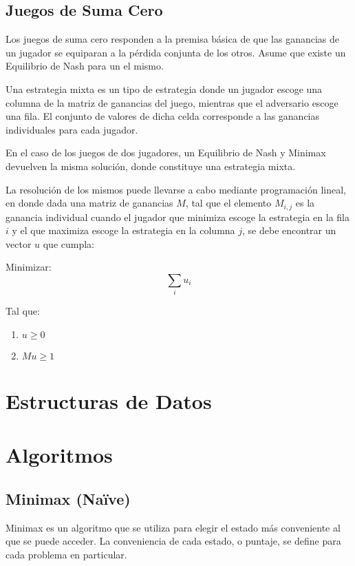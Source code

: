 \documentclass[10pt,a4paper,notitlepage,draft]{article}
\newenvironment{definition}[1][Definición]{\begin{trivlist}
\item[\hskip \labelsep {\bfseries #1}]}{\end{trivlist}}
\begin{document}
\subsection{Juegos de Suma Cero}

Los juegos de suma cero responden a la premisa básica de que las ganancias de un jugador se equiparan a la pérdida conjunta de los otros. Asume que existe un Equilibrio de Nash para un el mismo.

\begin{definition}
Una estrategia mixta es un tipo de estrategia donde un jugador escoge una columna de la matriz de ganancias del juego, mientras que el adversario escoge una fila. El conjunto de valores de dicha celda corresponde a las ganancias individuales para cada jugador.
\end{definition}

En el caso de los juegos de dos jugadores, un Equilibrio de Nash y Minimax devuelven la misma solución, donde constituye una estrategia mixta.

La resolución de los mismos puede llevarse a cabo mediante programación lineal, en donde dada una matriz de ganancias $M$, tal que el elemento $M_{i, j}$ es la ganancia individual cuando el jugador que minimiza escoge la estrategia en la fila $i$ y el que maximiza escoge la estrategia en la columna $j$, se debe encontrar un vector $u$ que cumpla:

Minimizar:
\begin{equation}
\sum_{i} u_i
\end{equation}

Tal que:
\begin{enumerate}
\item $u \geq 0$
\item $M u \geq 1$
\end{enumerate}
\cite{mic}

\section{Estructuras de Datos}
\section{Algoritmos}
\subsection{Minimax (Na\"ive)}
  Minimax es un algoritmo que se utiliza para elegir el estado más conveniente al que se puede acceder.
  La conveniencia de cada estado, o puntaje, se define para cada problema en particular.
\end{document}
